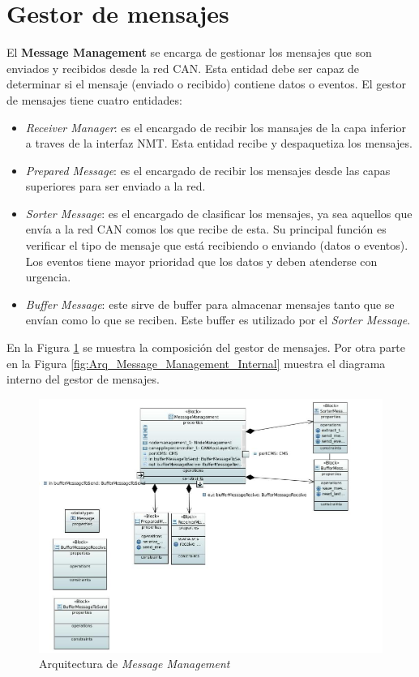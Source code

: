 \section{Gestor de mensajes}
El \textbf{Message Management} se encarga de gestionar los mensajes que son
enviados y recibidos desde la red CAN. Esta entidad debe ser capaz de determinar
si el mensaje (enviado o recibido) contiene datos o eventos. El gestor de
mensajes tiene cuatro entidades:
\begin{itemize}
\item \textit{Receiver Manager}: es el encargado de recibir los mansajes de la
  capa inferior a traves de la interfaz NMT. Esta entidad recibe y despaquetiza
  los mensajes.
\item \textit{Prepared Message}: es el encargado de recibir los mensajes desde
  las capas superiores para ser enviado a la red.
\item \textit{Sorter Message}: es el encargado de clasificar los mensajes,
  ya sea aquellos que envía a la red CAN comos los que recibe de esta. Su
  principal función es verificar  el tipo de mensaje que está recibiendo o
  enviando (datos o eventos). Los eventos tiene mayor prioridad que los datos
  y deben atenderse con urgencia.
\item \textit{Buffer Message}: este sirve de buffer para almacenar mensajes
  tanto que se envían como lo que se reciben. Este buffer es utilizado por el
  \textit{Sorter Message}.
\end{itemize}

En la Figura \ref{fig:Arq_Message_Management} se muestra la composición del
gestor de mensajes. Por otra parte en la Figura
\ref{fig:Arq_Message_Management_Internal} muestra el diagrama interno del
gestor de mensajes.

\begin{figure}[h!]
 \centering
 \includegraphics[scale=0.4]{images/Secciones/AppendixA/MessageManagement.JPG}
  \caption{Arquitectura de \textit{Message Management}}
\label{fig:Arq_Message_Management}
\end{figure}

